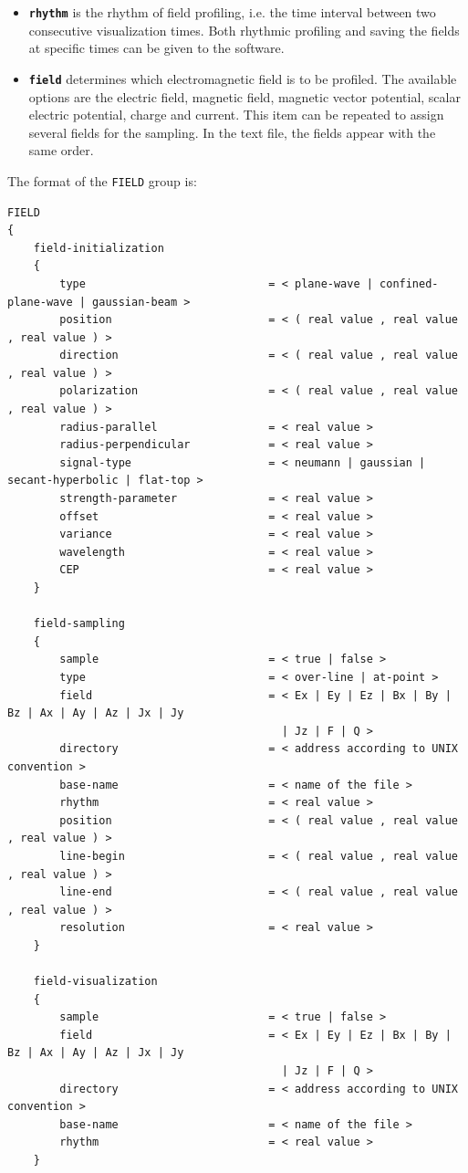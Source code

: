 \begin{enumerate}
\begin{itemize}
	\item \textbf{\texttt{rhythm}} is the rhythm of field profiling, i.e. the time interval between two consecutive visualization times. Both rhythmic profiling and saving the fields at specific times can be given to the software.
	\item \textbf{\texttt{field}} determines which electromagnetic field is to be profiled. The available options are the electric field, magnetic field, magnetic vector potential, scalar electric potential, charge and current. This item can be repeated to assign several fields for the sampling. In the text file, the fields appear with the same order.
\end{itemize}
\end{enumerate}

The format of the \texttt{FIELD} group is:
\begin{Verbatim}[frame=single,fontsize=\small,tabsize=4]
FIELD
{
	field-initialization
	{
		type                            = < plane-wave | confined-plane-wave | gaussian-beam >
		position                        = < ( real value , real value , real value ) >
		direction                       = < ( real value , real value , real value ) >
		polarization                    = < ( real value , real value , real value ) >
		radius-parallel                 = < real value >
		radius-perpendicular            = < real value >
		signal-type                     = < neumann | gaussian | secant-hyperbolic | flat-top >
		strength-parameter              = < real value >
		offset                          = < real value >
		variance                        = < real value >
		wavelength                      = < real value >
		CEP                             = < real value >
	}
	
	field-sampling
	{
		sample                          = < true | false >
		type							= < over-line | at-point >
		field                           = < Ex | Ey | Ez | Bx | By | Bz | Ax | Ay | Az | Jx | Jy
                                          | Jz | F | Q >
		directory                       = < address according to UNIX convention >
		base-name                       = < name of the file >
		rhythm                          = < real value >
		position                        = < ( real value , real value , real value ) >
		line-begin                      = < ( real value , real value , real value ) >
		line-end                        = < ( real value , real value , real value ) >
		resolution                      = < real value >
	}

	field-visualization
	{
		sample                          = < true | false >
		field                           = < Ex | Ey | Ez | Bx | By | Bz | Ax | Ay | Az | Jx | Jy
                                          | Jz | F | Q >
		directory                       = < address according to UNIX convention >
		base-name                       = < name of the file >
		rhythm                          = < real value >
	}
	

\end{Verbatim}
